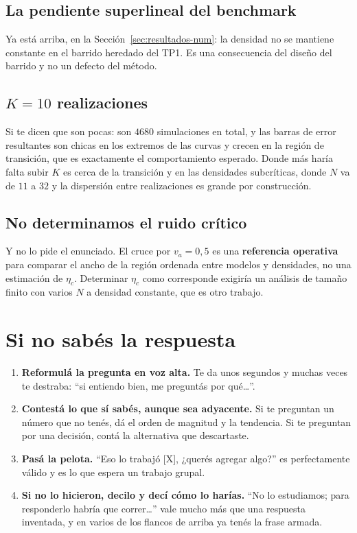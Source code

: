 \documentclass[11pt]{article}
\begin{document}
\subsection{La pendiente superlineal del benchmark}

Ya está arriba, en la Sección~\ref{sec:resultados-num}: la densidad no se
mantiene constante en el barrido heredado del TP1. Es una consecuencia del
diseño del barrido y no un defecto del método.

\subsection{$K = 10$ realizaciones}

Si te dicen que son pocas: son $4680$ simulaciones en total, y las barras de
error resultantes son chicas en los extremos de las curvas y crecen en la
región de transición, que es exactamente el comportamiento esperado. Donde más
haría falta subir $K$ es cerca de la transición y en las densidades subcríticas,
donde $N$ va de $11$ a $32$ y la dispersión entre realizaciones es grande por
construcción.

\subsection{No determinamos el ruido crítico}

Y no lo pide el enunciado. El cruce por $v_a = 0{,}5$ es una \textbf{referencia
operativa} para comparar el ancho de la región ordenada entre modelos y
densidades, no una estimación de $\eta_c$. Determinar $\eta_c$ como corresponde
exigiría un análisis de tamaño finito con varios $N$ a densidad constante, que
es otro trabajo.

\section{Si no sabés la respuesta}

\begin{enumerate}
  \item \textbf{Reformulá la pregunta en voz alta.} Te da unos segundos y muchas
    veces te destraba: ``si entiendo bien, me preguntás por qué\ldots''.
  \item \textbf{Contestá lo que sí sabés, aunque sea adyacente.} Si te preguntan
    un número que no tenés, dá el orden de magnitud y la tendencia. Si te
    preguntan por una decisión, contá la alternativa que descartaste.
  \item \textbf{Pasá la pelota.} ``Eso lo trabajó [X], ¿querés agregar algo?''
    es perfectamente válido y es lo que espera un trabajo grupal.
  \item \textbf{Si no lo hicieron, decilo y decí cómo lo harías.} ``No lo
    estudiamos; para responderlo habría que correr\ldots'' vale mucho más que
    una respuesta inventada, y en varios de los flancos de arriba ya tenés la
    frase armada.
\end{enumerate}

\end{document}

